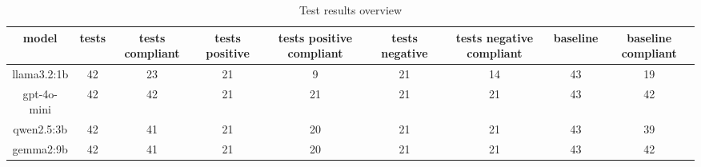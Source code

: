
  \begin{table}[h!]
  \centering
  \begin{tabular}{|c|c|c|c|c|c|c|c|c|}
  \hline
  model & tests & tests compliant & tests positive & tests positive compliant & tests negative & tests negative compliant & baseline & baseline compliant \\
  \hline
  llama3.2:1b & 42 & 23 & 21 & 9 & 21 & 14 & 43 & 19\\
\hline
gpt-4o-mini & 42 & 42 & 21 & 21 & 21 & 21 & 43 & 42\\
\hline
qwen2.5:3b & 42 & 41 & 21 & 20 & 21 & 21 & 43 & 39\\
\hline
gemma2:9b & 42 & 41 & 21 & 20 & 21 & 21 & 43 & 42
  \end{tabular}
  \caption{Test results overview}
  
  \end{table}
  